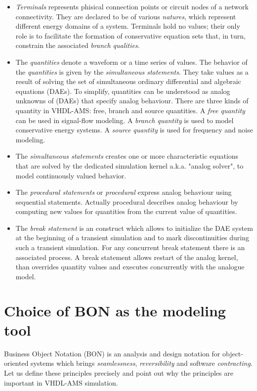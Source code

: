 \documentclass{article}
\begin{document}
\begin{itemize}
\item \emph{Terminals} represents phisical connection points or
circuit nodes of a network connectivity. They are declared to be of
various \emph{natures}, which represent different energy domains of a
system.  Terminals hold no values; their only role is to facilitate
the formation of conservative equation sets that, in turn, constrain
the associated \emph{branch qualities}.
\item The \emph{quantities} denote a waveform or a time series of
values.  The behavior of the \emph{quantities} is given by the
\emph{simultaneous statements}. They take values as a result of
solving the set of simultaneous ordinary differential and algebraic
equations (DAEs). To simplify, quantities can be understood as analog
unknowns of (DAEs) that specify analog behaviour. There are three
kinds of quantity in VHDL-AMS: free, branch and source quantities. A
\emph{free quantity} can be used in signal-flow modeling. A
\emph{branch quantity} is used to model conservative energy systems. A
\emph{source quantity} is used for frequency and noise modeling.
\item The \emph{simultaneous statements} creates one or more
characteristic equations that are solved by the dedicated simulation
kernel a.k.a.  "analog solver", to model continuously valued behavior.
\item The \emph{procedural statements} or \emph{procedural} express
analog behaviour using sequential statements. Actually procedural
describes analog behaviour by computing new values for quantities from
the current value of quantities.
\item The \emph{break statement} is an construct which allows to
initialize the DAE system at the beginning of a transient simulation
and to mark discontinuities during such a transient simulation. For
any concurrent break statement there is an associated process.  A
break statement allows restart of the analog kernel, than overrides
quantity values and executes concurrently with the analogue model.

\end{itemize}
 
\section{Choice of BON as the modeling tool}
\label{sec:choiceobon} %
Business Object Notation (BON) is an analysis and design notation for
object-oriented systems which brings \emph{seamlessness},\xspace
\emph{reversibility} and software \emph{contracting}.  Let us define
these principles precisely and point out why the principles are
important in VHDL-AMS simulation.
\end{document}
